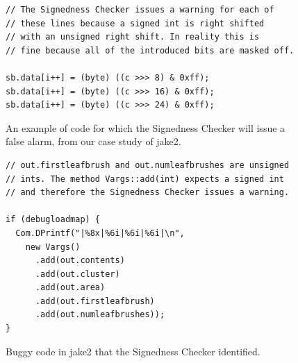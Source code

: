 \documentclass{sig-alternate-05-2015}
\begin{document}
\begin{figure}[t]
\begin{lstlisting}
// The Signedness Checker issues a warning for each of
// these lines because a signed int is right shifted
// with an unsigned right shift. In reality this is
// fine because all of the introduced bits are masked off.

sb.data[i++] = (byte) ((c >>> 8) & 0xff);
sb.data[i++] = (byte) ((c >>> 16) & 0xff);
sb.data[i++] = (byte) ((c >>> 24) & 0xff);

\end{lstlisting}
\vspace{-10pt}
\caption{An example of code for which the Signedness Checker will issue a false
alarm, from our case study of jake2.}
\label{fig:false-alarm}
\end{figure}

\begin{figure}[t]
\begin{lstlisting}
// out.firstleafbrush and out.numleafbrushes are unsigned
// ints. The method Vargs::add(int) expects a signed int
// and therefore the Signedness Checker issues a warning.

if (debugloadmap) {
  Com.DPrintf("|%8x|%6i|%6i|%6i|\n",
    new Vargs()
      .add(out.contents)
      .add(out.cluster)
      .add(out.area)
      .add(out.firstleafbrush)
      .add(out.numleafbrushes));
}

\end{lstlisting}
\vspace{-10pt}
\caption{Buggy code in jake2 that the Signedness Checker identified.}
\label{fig:bug}
\end{figure}

\newpage


\end{document}
